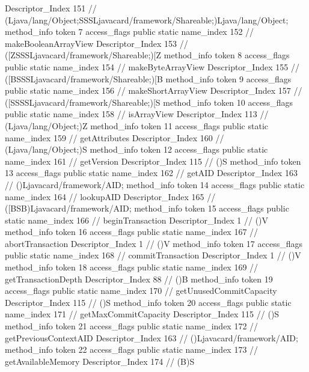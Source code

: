 {{{{{					Descriptor_Index	151		// (Ljava/lang/Object;SSSLjavacard/framework/Shareable;)Ljava/lang/Object;
				}
				method_info {
					token	7
					access_flags	public static
					name_index	152		// makeBooleanArrayView
					Descriptor_Index	153		// ([ZSSSLjavacard/framework/Shareable;)[Z
				}
				method_info {
					token	8
					access_flags	public static
					name_index	154		// makeByteArrayView
					Descriptor_Index	155		// ([BSSSLjavacard/framework/Shareable;)[B
				}
				method_info {
					token	9
					access_flags	public static
					name_index	156		// makeShortArrayView
					Descriptor_Index	157		// ([SSSSLjavacard/framework/Shareable;)[S
				}
				method_info {
					token	10
					access_flags	public static
					name_index	158		// isArrayView
					Descriptor_Index	113		// (Ljava/lang/Object;)Z
				}
				method_info {
					token	11
					access_flags	public static
					name_index	159		// getAttributes
					Descriptor_Index	160		// (Ljava/lang/Object;)S
				}
				method_info {
					token	12
					access_flags	public static
					name_index	161		// getVersion
					Descriptor_Index	115		// ()S
				}
				method_info {
					token	13
					access_flags	public static
					name_index	162		// getAID
					Descriptor_Index	163		// ()Ljavacard/framework/AID;
				}
				method_info {
					token	14
					access_flags	public static
					name_index	164		// lookupAID
					Descriptor_Index	165		// ([BSB)Ljavacard/framework/AID;
				}
				method_info {
					token	15
					access_flags	public static
					name_index	166		// beginTransaction
					Descriptor_Index	1		// ()V
				}
				method_info {
					token	16
					access_flags	public static
					name_index	167		// abortTransaction
					Descriptor_Index	1		// ()V
				}
				method_info {
					token	17
					access_flags	public static
					name_index	168		// commitTransaction
					Descriptor_Index	1		// ()V
				}
				method_info {
					token	18
					access_flags	public static
					name_index	169		// getTransactionDepth
					Descriptor_Index	88		// ()B
				}
				method_info {
					token	19
					access_flags	public static
					name_index	170		// getUnusedCommitCapacity
					Descriptor_Index	115		// ()S
				}
				method_info {
					token	20
					access_flags	public static
					name_index	171		// getMaxCommitCapacity
					Descriptor_Index	115		// ()S
				}
				method_info {
					token	21
					access_flags	public static
					name_index	172		// getPreviousContextAID
					Descriptor_Index	163		// ()Ljavacard/framework/AID;
				}
				method_info {
					token	22
					access_flags	public static
					name_index	173		// getAvailableMemory
					Descriptor_Index	174		// (B)S
}}}}}
